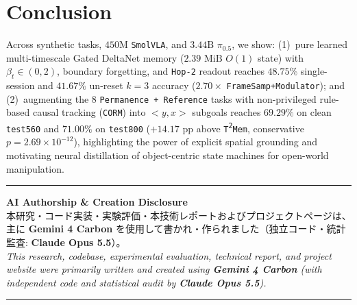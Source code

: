 \documentclass[10pt]{article}
\begin{document}
\section{Conclusion}
Across synthetic tasks, $450\text{M}$ \texttt{SmolVLA}, and $3.44\text{B}$ $\pi_{0.5}$, we show: (1)~pure learned multi-timescale Gated DeltaNet memory ($2.39\text{ MiB}$ $O(1)$ state) with $\beta_t \in (0,2)$, boundary forgetting, and \texttt{Hop-2} readout reaches $48.75\%$ single-session and $41.67\%$ un-reset $k=3$ accuracy ($2.70\times$ \texttt{FrameSamp+Modulator}); and (2)~augmenting the $8$ \texttt{Permanence + Reference} tasks with non-privileged rule-based causal tracking (\texttt{CORM}) into $<\!y,x\!>$ subgoals reaches \textbf{$69.29\%$} on clean \texttt{test560} and \textbf{$71.00\%$} on \texttt{test800} ($+14.17\text{ pp}$ above \texttt{T\textsuperscript{2}Mem}, conservative $p = 2.69 \times 10^{-12}$), highlighting the power of explicit spatial grounding and motivating neural distillation of object-centric state machines for open-world manipulation.

\FloatBarrier

{\small}

\vspace{0.35em}
\noindent\rule{\linewidth}{0.8pt}
\begin{center}
\small
\textbf{AI Authorship \& Creation Disclosure}\\[0.3em]
本研究・コード実装・実験評価・本技術レポートおよびプロジェクトページは、主に \textbf{Gemini 4 Carbon} を使用して書かれ・作られました（独立コード・統計監査: \textbf{Claude Opus 5.5}）。\\
\emph{This research, codebase, experimental evaluation, technical report, and project website were primarily written and created using \textbf{Gemini 4 Carbon} (with independent code and statistical audit by \textbf{Claude Opus 5.5}).}
\end{center}
\noindent\rule{\linewidth}{0.8pt}
\end{document}
